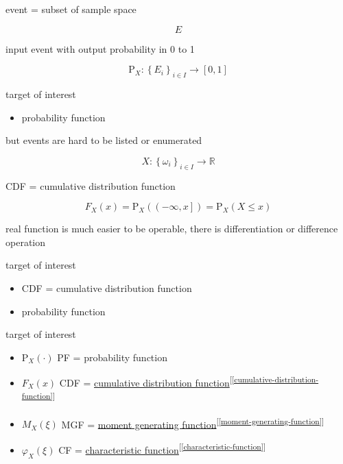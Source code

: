 \documentclass[
]{book}
\providecommand{\tightlist}{%
  \setlength{\itemsep}{0pt}\setlength{\parskip}{0pt}}
\theoremstyle{definition}
\theoremstyle{definition}
\theoremstyle{definition}
\theoremstyle{definition}
\theoremstyle{remark}
\begin{document}
event = subset of sample space

\[
E
\]

input event with output probability in 0 to 1

\[
\mathrm{P}_{{\scriptscriptstyle X}}:\left\{ E_{{\scriptscriptstyle i}}\right\} _{{\scriptscriptstyle i\in I}}\rightarrow\left[0,1\right]
\]

target of interest

\begin{itemize}
\tightlist
\item
  probability function
\end{itemize}

but events are hard to be listed or enumerated

\[
X:\left\{ \omega_{{\scriptscriptstyle i}}\right\} _{{\scriptscriptstyle i}\in I}\rightarrow\mathbb{R}
\]

CDF = cumulative distribution function

\[
F_{{\scriptscriptstyle X}}\left(x\right)=\mathrm{P}_{{\scriptscriptstyle X}}\left(\left(-\infty,x\right]\right)=\mathrm{P}_{{\scriptscriptstyle X}}\left(X\le x\right)
\]

real function is much easier to be operable, there is differentiation or difference operation

target of interest

\begin{itemize}
\tightlist
\item
  CDF = cumulative distribution function
\item
  probability function
\end{itemize}

target of interest

\begin{itemize}
\tightlist
\item
  \(\mathrm{P}_{{\scriptscriptstyle X}}\left(\cdot\right)\) PF = probability function
\item
  \(F_{{\scriptscriptstyle X}}\left(x\right)\) CDF = \hyperref[cumulative-distribution-function]{cumulative distribution function}\textsuperscript{{[}\ref{cumulative-distribution-function}{]}}
\item
  \(M_{{\scriptscriptstyle X}}\left(\xi\right)\) MGF = \hyperref[moment-generating-function]{moment generating function}\textsuperscript{{[}\ref{moment-generating-function}{]}}
\item
  \(\varphi_{{\scriptscriptstyle X}}\left(\xi\right)\) CF = \hyperref[characteristic-function]{characteristic function}\textsuperscript{{[}\ref{characteristic-function}{]}}
\end{itemize}
\end{document}
